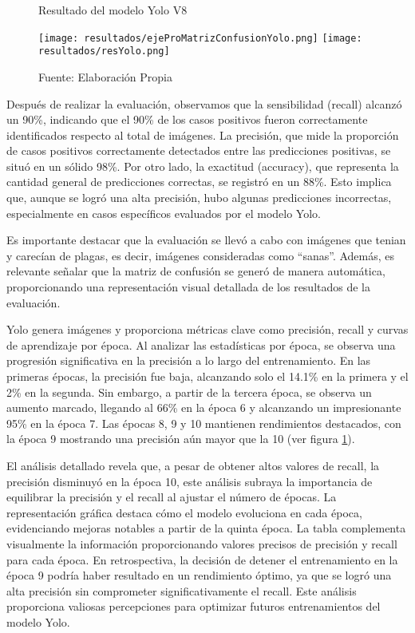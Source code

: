 \newpage

\begin{figure}[h]
\centering
\caption{Resultado del modelo Yolo V8}
\texttt{[image: resultados/ejeProMatrizConfusionYolo.png]}
\texttt{[image: resultados/resYolo.png]}
\caption*{\footnotesize Fuente: Elaboración Propia}
\label{fig:figuraEjeProMatrizConfusion}
\end{figure}

Después de realizar la evaluación, observamos que la sensibilidad (recall) alcanzó un 90\%, indicando que el 90\% de los casos positivos fueron correctamente identificados respecto al total de imágenes. La precisión, que mide la proporción de casos positivos correctamente detectados entre las predicciones positivas, se situó en un sólido 98\%. Por otro lado, la exactitud (accuracy), que representa la cantidad general de predicciones correctas, se registró en un 88\%. Esto implica que, aunque se logró una alta precisión, hubo algunas predicciones incorrectas, especialmente en casos específicos evaluados por el modelo Yolo.


\newpage

Es importante destacar que la evaluación se llevó a cabo con imágenes que tenian y carecían de plagas, es decir, imágenes consideradas como ``sanas''. Además, es relevante señalar que la matriz de confusión se generó de manera automática, proporcionando una representación visual detallada de los resultados de la evaluación.

Yolo genera imágenes y proporciona métricas clave como precisión, recall y curvas de aprendizaje por época. Al analizar las estadísticas por época, se observa una progresión significativa en la precisión a lo largo del entrenamiento. En las primeras épocas, la precisión fue baja, alcanzando solo el 14.1\% en la primera y el 2\% en la segunda. Sin embargo, a partir de la tercera época, se observa un aumento marcado, llegando al 66\% en la época 6 y alcanzando un impresionante 95\% en la época 7. Las épocas 8, 9 y 10 mantienen rendimientos destacados, con la época 9 mostrando una precisión aún mayor que la 10 (ver figura \ref{fig:figuraEjeProMatrizConfusion}).

El análisis detallado revela que, a pesar de obtener altos valores de recall, la precisión disminuyó en la época 10, este análisis subraya la importancia de equilibrar la precisión y el recall al ajustar el número de épocas. La representación gráfica destaca cómo el modelo evoluciona en cada época, evidenciando mejoras notables a partir de la quinta época. La tabla complementa visualmente la información proporcionando valores precisos de precisión y recall para cada época. En retrospectiva, la decisión de detener el entrenamiento en la época 9 podría haber resultado en un rendimiento óptimo, ya que se logró una alta precisión sin comprometer significativamente el recall. Este análisis proporciona valiosas percepciones para optimizar futuros entrenamientos del modelo Yolo.


